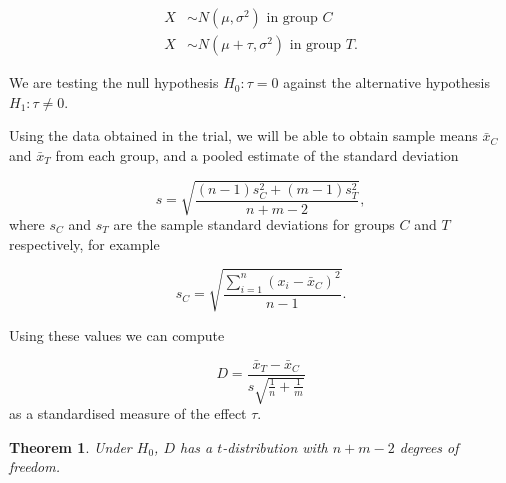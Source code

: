 \documentclass[
  openany]{book}
\newtheorem{theorem}{Theorem}[chapter]
\theoremstyle{definition}
\theoremstyle{definition}
\theoremstyle{definition}
\theoremstyle{definition}
\theoremstyle{remark}
\begin{document}
\begin{align*}
X & \sim N\left(\mu, \sigma^2\right) \text{ in group }C\\
X & \sim N\left(\mu + \tau, \sigma^2\right) \text{ in group }T.
\end{align*}

We are testing the null hypothesis \(H_0: \tau=0\) against the alternative hypothesis \(H_1: \tau\neq{0}\).

Using the data obtained in the trial, we will be able to obtain sample means \(\bar{x}_C\) and \(\bar{x}_T\) from each group, and a pooled estimate of the standard deviation

\[ s = \sqrt{\frac{\left(n-1\right)s_C^2 + (m-1)s_T^2}{n+m - 2}},
\]
where \(s_C\) and \(s_T\) are the sample standard deviations for groups \(C\) and \(T\) respectively, for example

\[
s_C = \sqrt{\frac{\sum\limits_{i=1}^n{\left(x_i - \bar{x}_C\right)^2}}{n-1}}.
\]

Using these values we can compute

\[D = \frac{\bar{x}_T - \bar{x}_C}{s\sqrt{\frac{1}{n} + \frac{1}{m}}}\]
as a standardised measure of the effect \(\tau\).

\begin{theorem}
Under \(H_0\), \(D\) has a \(t\)-distribution with \(n+m-2\) degrees of freedom.
\end{theorem}
\end{document}
